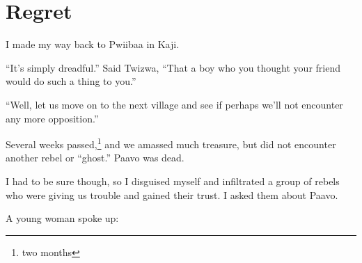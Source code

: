 \chapter{Regret}

I made my way back to Pwiibaa in Ka\-ji.

``It's simply dreadful.'' Said Twi\-zwa, ``That a boy who you thought your friend would do such a thing to you.''

``Well, let us move on to the next village and see if perhaps we'll not encounter any more opposition.''

Several weeks passed,\footnote{two months} and we amassed much treasure, but did not encounter another rebel or ``ghost.'' Paa\-vo was dead.

I had to be sure though, so I disguised myself and infiltrated a group of rebels who were giving us trouble and gained their trust. I asked them about Paa\-vo.

A young woman spoke up:

